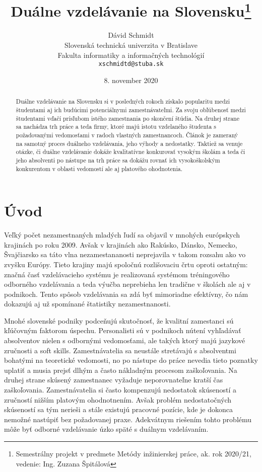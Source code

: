\documentclass[10pt,oneside,slovak,a4paper]{article}
\title{Duálne vzdelávanie na Slovensku\thanks{Semestrálny projekt v predmete Metódy inžinierskej práce, ak. rok 2020/21, vedenie: Ing. Zuzana Špitálová}}
\author{Dávid Schmidt\\[2pt]
	{\small Slovenská technická univerzita v Bratislave}\\
	{\small Fakulta informatiky a informačných technológií}\\
	{\small \texttt{xschmidtd@stuba.sk}}
	}
\date{\small 8. november 2020}
\begin{document}
\maketitle

\begin{abstract}
Duálne vzdelávanie na Slovensku si v posledných rokoch získalo popularitu medzi študentami aj ich budúcimi potenciálnymi zamestnávateľmi. Za svoju obľúbenosť medzi študentami vďačí prísľubom istého zamestnania po skončení štúdia. Na druhej strane sa nachádza trh práce a teda firmy, ktoré majú istotu vzdelaného študenta s požadovanými vedomosťami v radoch vlastných zamestnancoch. Článok je zameraný na samotný proces duálneho vzdelávania, jeho výhody a nedostatky. Taktiež sa venuje otázke, či duálne vzdelávanie dokáže kvalitatívne konkurovať vysokým školám a teda či jeho absolventi po nástupe na trh práce sa dokážu rovnať ich vysokoškolským konkurentom v oblasti vedomostí ale aj platového ohodnotenia.

\end{abstract}


\section{Úvod}
\quad Veľký počet nezamestnaných mladých ľudí sa objavil v mnohých európskych krajinách po roku 2009. Avšak v krajinách ako Rakúsko, Dánsko, Nemecko, Švajčiarsko sa táto vlna nezamestananosti neprejavila v takom rozsahu ako vo zvyšku Európy. 
Tieto krajiny majú spoločnú rozlišovaciu črtu oproti ostatným: značná časť vzdelávacieho systému je realizovaná systémom tréningového odborného vzdelávania a teda výučba neprebieha len tradične v školách ale aj v podnikoch. Tento spôsob vzdelávania sa zdá byť mimoriadne efektívny, čo nám dokazujú aj už spomínané štatistiky nezamestnanosti. 

Mnohé slovenské podniky podceňujú skutočnosť, že kvalitní zamestanci sú kľúčovným faktorom úspechu. Personalisti sú v podnikoch nútení vyhľadávať absolventov nielen s odbornými vedomosťami, ale takých ktorý majú jazykové zručnosti a soft skills. Zamestnávatelia sa neustále stretávajú s absolventmi bohatými na teoretické vedomosti, no po nástupe do práce nevedia tieto poznatky uplatiť a musia prejsť dlhým a často nákladným procesom zaškoľovania. Na druhej strane skúsený zamestnanec vyžaduje neporovnateľne kratší čas zaškoľovania. Zamestnávatelia si často kompenzujú nedostatok skúseností a zručností nižším platovým ohodnotnením. Avšak problém nedostatočných skúseností sa tým nerieši a stále existujú pracovné pozície, kde je dokonca nemožné nastúpiť bez požadovanej praxe. Adekvátnym riešením tohto problému môže byť odborné vzdelávanie úzko späté s duálnym vzdelávaním.
\end{document}
